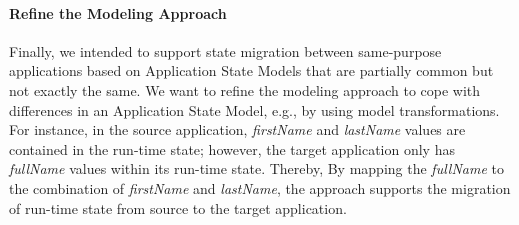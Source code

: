 \paragraph{Refine the Modeling Approach}
Finally, we intended to support state migration between same-purpose applications based on Application State Models that are partially common but not exactly the same.
We want to refine the modeling approach to cope with differences in an Application State Model, e.g., by using model transformations.
For instance, in the source application, \textit{firstName} and \textit{lastName} values are contained in the run-time state; however, the target application only has \textit{fullName} values within its run-time state.
Thereby, By mapping the \textit{fullName} to the combination of \textit{firstName} and \textit{lastName}, the approach supports the migration of run-time state from source to the target application.



